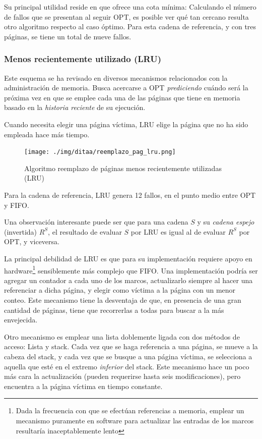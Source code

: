 \documentclass[11pt,fleqn]{book} %
\begin{document}
Su principal utilidad reside en que ofrece una cota mínima:
Calculando el número de fallos que se presentan al seguir OPT,
es posible ver qué tan cercano resulta otro algoritmo respecto al caso
óptimo. Para esta cadena de referencia, y con tres páginas, se tiene
un total de nueve fallos.
\subsubsection{Menos recientemente utilizado (LRU)}
\label{sec-5-5-3-3}

Este esquema se ha revisado en diversos mecanismos relacionados con la
administración de memoria. Busca acercarse a OPT \emph{prediciendo} cuándo
será la próxima vez en que se emplee cada una de las páginas que
tiene en memoria basado en la \emph{historia reciente} de su
ejecución.

Cuando necesita elegir una página víctima, LRU elige la página que no
ha sido empleada hace más tiempo.

\begin{figure}[htb]
\centering
\texttt{[image: ./img/ditaa/reemplazo\_pag\_lru.png]}
\caption{\label{MEM_reemplazo_pag_lru}Algoritmo reemplazo de páginas menos recientemente utilizadas (LRU)}
\end{figure}

Para la cadena de referencia, LRU genera 12 fallos, en el punto
medio entre OPT y FIFO.

Una observación interesante puede ser que para una cadena $S$ y su
\emph{cadena espejo} (invertida) $R^S$, el resultado de evaluar $S$ por
LRU es igual al de evaluar $R^S$ por OPT, y viceversa.

La principal debilidad de LRU es que para su implementación requiere
apoyo en hardware\footnote{Dada la frecuencia con que se efectúan
referencias a memoria, emplear un mecanismo puramente en software para
actualizar las entradas de los marcos resultaría inaceptablemente
lento } sensiblemente más complejo que FIFO. Una implementación podría
ser agregar un contador a cada uno de los marcos, actualizarlo siempre
al hacer una referenciar a dicha página, y elegir como víctima a la
página con un menor conteo. Este mecanismo tiene la desventaja de que,
en presencia de una gran cantidad de páginas, tiene que recorrerlas a
todas para buscar a la más envejecida.

Otro mecanismo es emplear una lista doblemente ligada con dos métodos
de acceso: Lista y stack. Cada vez que se haga referencia a una
página, se mueve a la cabeza del stack, y cada vez que se busque a
una página víctima, se selecciona a aquella que esté en el extremo
\emph{inferior} del stack. Este mecanismo hace un poco más cara la
actualización (pueden requerirse hasta seis modificaciones), pero
encuentra a la página víctima en tiempo constante.
\end{document}
